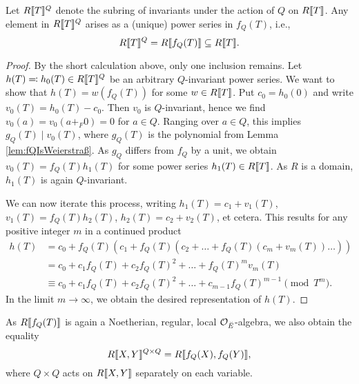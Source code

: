 \documentclass[../main.tex]{subfiles}
\begin{document}
\begin{prop}\label{prop:DescriptionOfInvariantsUnderQAction}
  Let $R\llbracket T \rrbracket^Q$ denote the subring of invariants under the action of 
  $Q$ on $R\llbracket T \rrbracket$. Any element in $R\llbracket T \rrbracket^Q$ arises as a 
  (unique) power series in $f_Q(T)$, i.e.,
  \begin{equation*}
    R\llbracket T \rrbracket^Q = R\llbracket f_Q(T) \rrbracket \subseteq R\llbracket T \rrbracket.
  \end{equation*}
\end{prop}
\begin{proof}
  By the short calculation above, only one inclusion remains. Let $h(T) \eqcolon
  h_0(T) \in R\llbracket T \rrbracket^Q$ be an arbitrary $Q$-invariant power series. We want
  to show that $h(T) = w(f_Q(T))$ for some $w \in R\llbracket T \rrbracket$. Put 
  $c_0 = h_0(0)$ and write $v_0(T) = h_0(T) - c_0$. Then $v_0$ is $Q$-invariant,
  hence we find $v_0(a) = v_0(a +_F 0) = 0$ for $a \in Q$. 
  Ranging over $a \in Q$, this implies $g_Q(T) \mid v_0(T)$, where $g_Q(T)$ is
  the polynomial from Lemma \ref{lem:fQIsWeierstraß}. As $g_Q$ differs from
  $f_Q$ by a unit, we obtain $v_0(T) = f_Q(T) h_1(T)$ for some power series
  $h_1(T) \in R\llbracket T \rrbracket$. As $R$ is a domain, $h_1(T)$ is again
  $Q$-invariant.

  We can now iterate this process, writing $h_1(T) = c_1 + v_1(T)$, 
  $v_1(T) = f_Q(T) h_2(T)$, $h_2(T) = c_2 + v_2(T)$, et cetera. This results
  for any positive integer $m$ in a continued product
  \begin{align*}
    h(T) &= c_0 + f_Q(T) (c_1 + f_Q(T)(c_2 + \dots + f_Q(T)(c_m + v_m(T)) \dots ))\\
         &= c_0 + c_1 f_Q(T) + c_2f_Q(T)^2 + \dots + f_Q(T)^m v_m(T)\\
         &\equiv c_0 + c_1 f_Q(T) + c_2f_Q(T)^2 + \dots + c_{m-1}f_Q(T)^{m-1}
         \pmod {T^m}.
  \end{align*}
  In the limit $m\to \infty$, we obtain the desired representation of $h(T)$.
\end{proof}

As $R\llbracket f_Q(T) \rrbracket$ is again a Noetherian, regular, local 
$\mathcal{O}_{\breve {E}}$-algebra, we also obtain the equality
\begin{equation*}
  R\llbracket X,Y \rrbracket^{Q \times Q} = R\llbracket f_Q(X), f_Q(Y) \rrbracket,
\end{equation*}
where $Q\times Q$ acts on $R\llbracket X,Y \rrbracket$ separately on each variable.
\end{document}
